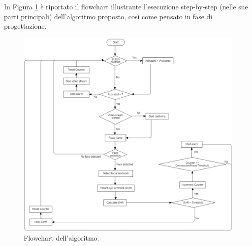 \documentclass[12pt]{article}
\begin{document}
In Figura \ref{fig:flowchart} è riportato il flowchart illustrante l'esecuzione step-by-step (nelle sue parti principali) dell'algoritmo proposto, così come pensato in fase di progettazione.
\begin{figure}[!htb]
	\centering
	\includegraphics[scale=0.58]{eps/flowchart.eps}
	\caption{Flowchart dell'algoritmo.}
	\label{fig:flowchart}
\end{figure}
\end{document}
